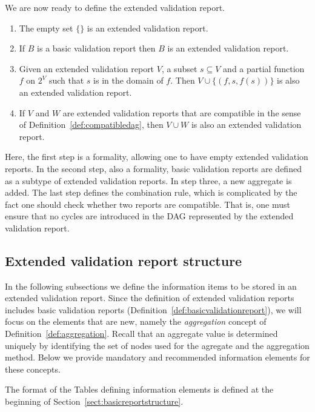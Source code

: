 We are now ready to define the extended validation report.
%
\begin{definition}\leavevmode
\label{def:extvalrep}
\begin{enumerate}
\item The empty set $\{\}$ is an extended validation report.
\item If $B$ is a basic validation report then $B$ is an extended validation report.
\item Given an extended validation report $V$, a subset $s\subseteq V$ and a
partial function $f$ on $2^V$ such that $s$ is in the domain of
$f$.  Then  $V\cup \{(f,s,f(s))\}$ is also an extended validation report. 
\item If $V$ and $W$ are extended validation reports that are compatible
in the sense of Definition~\ref{def:compatibledag}, then $V\cup W$ is
also an extended validation report.
\end{enumerate}
\end{definition}
Here, the first step is a formality, allowing one to have empty extended
validation reports. In the second step, also a formality, basic validation
reports are defined as a subtype of extended validation reports.  In step
three, a new aggregate is added.  The last step defines the combination rule,
which is complicated by the fact one should check whether two reports are
compatible. That is, one must ensure that no cycles are introduced in the DAG
represented by the extended validation report.



\subsection{Extended validation report structure}
\label{sect:extendedreport}
In the following subsections we define the information items to be stored in an
extended validation report. Since the definition of extended validation reports
includes basic validation reports (Definition~\ref{def:basicvalidationreport}),
we will focus on the elements that are new, namely the \emph{aggregation}
concept of Definition~\ref{def:aggregation}.  Recall that an aggregate value is
determined uniquely by identifying the set of nodes used for the agregate and
the aggregation method. Below we provide mandatory and recommended information
elements for these concepts.

The format of the Tables defining information elements is defined at the
beginning of Section~\ref{sect:basicreportstructure}.


